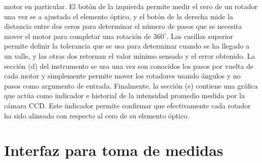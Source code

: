 motor en particular. El botón de la izquierda permite medir el cero de
un rotador una vez se a ajustado el elemento óptico, y el botón de la
derecha mide la distancia entre dos ceros para determinar el número de
pasos que se necesita mover el motor para completar una rotación de
$360^{\circ}$. Las casillas superior permite definir la
tolerancia que se usa para determinar cuando se ha llegado a un valle,
y las otras dos retornan el valor mínimo sensado y el error obtenido. 
La sección (d) del instrumento se usa una vez son conocidos los pasos
por vuelta de cada motor y simplemente permite mover los rotadores
usando ángulos y no pasos como argumento de entrada. Finalmente, la
sección (e) contiene una gráfica que actúa como indicador e historial
de la intensidad promedio medida por la cámara CCD. Este indicador
permite confirmar que efectivamente cada rotador ha sido alineado
con respecto al cero de su elemento óptico. 

\section{Interfaz para toma de medidas}

